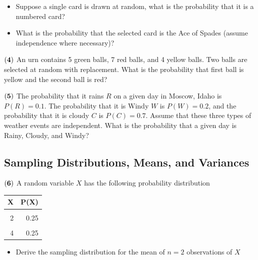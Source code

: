 \documentclass[
]{article}
\providecommand{\tightlist}{%
  \setlength{\itemsep}{0pt}\setlength{\parskip}{0pt}}
\begin{document}
\begin{itemize}
\tightlist
\item
  Suppose a single card is drawn at random, what is the probability that
  it is a numbered card?
\end{itemize}

\begin{itemize}
\tightlist
\item
  What is the probability that the selected card is the Ace of Spades
  (assume independence where necessary)?
\end{itemize}

\(\bf (4)\) An urn contains 5 green balls, 7 red balls, and 4 yellow
balls. Two balls are selected at random with replacement. What is the
probability that first ball is yellow and the second ball is red?

\(\bf (5)\) The probability that it rains \(R\) on a given day in
Moscow, Idaho is \(P(R) = 0.1\). The probability that it is Windy \(W\)
is \(P(W) = 0.2\), and the probability that it is cloudy \(C\) is
\(P(C) = 0.7\). Assume that these three types of weather events are
independent. What is the probability that a given day is Rainy, Cloudy,
and Windy?

\subsection{Sampling Distributions, Means, and
Variances}\label{sampling-distributions-means-and-variances}

\(\bf (6)\) A random variable \(X\) has the following probability
distribution

\begin{table}[H]
\centering\centering
\begin{tabular}{rr}
\toprule
X & P(X)\\
\midrule
\cellcolor{gray!10}{1} & \cellcolor{gray!10}{0.25}\\
2 & 0.25\\
\cellcolor{gray!10}{3} & \cellcolor{gray!10}{0.25}\\
4 & 0.25\\
\bottomrule
\end{tabular}
\end{table}

\begin{itemize}
\tightlist
\item
  Derive the sampling distribution for the mean of \(n=2\) observations
  of \(X\)
\end{itemize}
\end{document}
